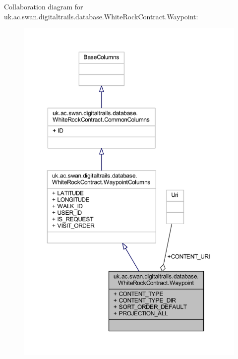 Collaboration diagram for uk.\+ac.\+swan.\+digitaltrails.\+database.\+White\+Rock\+Contract.\+Waypoint\+:
\nopagebreak
\begin{figure}[H]
\begin{center}
\leavevmode
\includegraphics[width=350pt]{classuk_1_1ac_1_1swan_1_1digitaltrails_1_1database_1_1_white_rock_contract_1_1_waypoint__coll__graph}
\end{center}
\end{figure}
